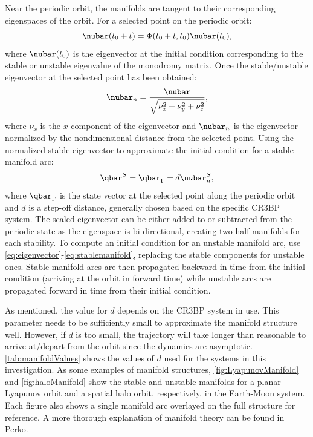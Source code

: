 Near the periodic orbit, the manifolds are tangent to their corresponding eigenspaces of the orbit.
For a selected point on the periodic orbit:
\begin{equation}
    \nubar(t_{0}+t)=\Phi(t_{0}+t,t_{0})\nubar(t_{0}),
    \label{eq:eigenvector}
\end{equation}
where $\nubar(t_{0})$ is the eigenvector at the initial condition corresponding to the stable or
unstable eigenvalue of the monodromy matrix. Once the stable/unstable eigenvector at the selected
point has been obtained:
\begin{equation}
    \nubar_{n}=\frac{\nubar}{\sqrt{\nu_{x}^{2}+\nu_{y}^{2}+\nu_{z}^{2}}},
    \label{eq:normeigenvector}
\end{equation}
where $\nu_{x}$ is the $x$-component of the eigenvector and $\nubar_{n}$ is the eigenvector
normalized by the nondimensional distance from the selected point. Using the normalized
stable eigenvector to approximate the initial condition for a stable manifold arc:
\begin{equation}
    \qbar^{S}=\qbar_{\Gamma}\pm d\nubar_{n}^{S},
    \label{eq:stablemanifold}
\end{equation}
where $\qbar_{\Gamma}$ is the state vector at the selected point along the periodic orbit and $d$
is a step-off distance, generally chosen based on the specific CR3BP system. The scaled eigenvector
can be either added to or subtracted from the periodic state as the eigenspace is bi-directional,
creating two half-manifolds for each stability. To compute an initial condition for an unstable
manifold arc, use \cref{eq:eigenvector}-\cref{eq:stablemanifold}, replacing the stable components
for unstable ones. Stable manifold arcs are then propagated backward in time from the initial
condition (arriving at the orbit in forward time) while unstable arcs are propagated forward in
time from their initial condition.

As mentioned, the value for $d$ depends on the CR3BP system in use. This parameter needs to be
sufficiently small to approximate the manifold structure well. However, if $d$ is too small, the
trajectory will take longer than reasonable to arrive at/depart from the orbit since the dynamics
are asymptotic\cite{Kakoi:2015}. \cref{tab:manifoldValues} shows the values of $d$ used for the
systems in this investigation. As some examples of manifold structures, \cref{fig:LyapunovManifold}
and \cref{fig:haloManifold} show the stable and unstable manifolds for a planar Lyapunov orbit and
a spatial halo orbit, respectively, in the Earth-Moon system. Each figure also shows a single
manifold arc overlayed on the full structure for reference. A more thorough explanation of manifold
theory can be found in Perko\cite{Perko:1991}.

